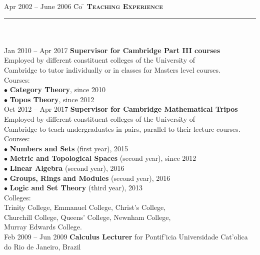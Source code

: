 \documentclass[11pt,a4paper]{article}
\begin{document}
\newpage 
\begin{tabbing}
Apr 2002 -- June 2006 \= Co \=\kill
\> \textbf{\Large{\textsc{Teaching Experience}}} \\
\> \noindent\rule{11cm}{1pt}\\
\> \\
\> Jan 2010 -- Apr 2017  \' \textbf{Supervisor for Cambridge Part III courses}\\ 
\> Employed by different constituent colleges of the University of \\ \> Cambridge  to tutor individually or in classes for Masters level courses.\\
\> Courses: \\
\> \> $\bullet$ {\bf Category Theory}, since 2010 \\ 
\> \> $\bullet$ {\bf Topos Theory}, since 2012\\ [5mm]
\> Oct 2012 -- Apr 2017 \' \textbf{Supervisor for Cambridge Mathematical Tripos}\\
\> Employed by different constituent colleges of the University of \\ \> Cambridge to teach undergraduates in pairs, parallel to their lecture courses.\\
\> Courses: \\ 
\> \> $\bullet$ {\bf Numbers and Sets} (first year), 2015 \\
\> \> $\bullet$ {\bf Metric and Topological Spaces} (second year), since 2012\\
\> \> $\bullet$ {\bf Linear Algebra} (second year), 2016\\
\> \> $\bullet$ {\bf Groups, Rings and Modules} (second year), 2016\\
\> \> $\bullet$ {\bf Logic and Set Theory} (third year), 2013\\
\> Colleges: \\
\> \> Trinity College, Emmanuel College, Christ's College, \\ 
\> \> Churchill College, Queens' College, Newnham College,\\ 
\> \> Murray Edwards College.\\ [5mm]
\> Feb 2009 -- Jun 2009 \' \textbf{Calculus Lecturer} for Pontif\a'icia Universidade Cat\a'olica\\ \> do Rio de Janeiro, Brazil\\ 
\end{tabbing}
\end{document}
